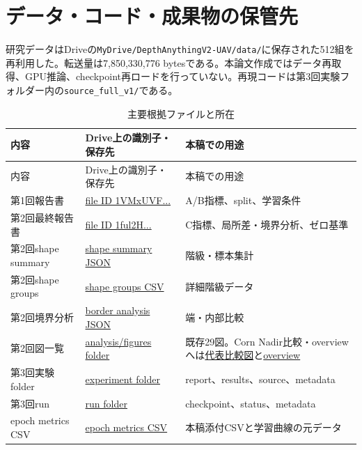 \section{データ・コード・成果物の保管先}
研究データはDriveの\texttt{MyDrive/DepthAnythingV2-UAV/data/}に保存された512組を再利用した。転送量は7,850,330,776 bytesである。本論文作成ではデータ再取得、GPU推論、checkpoint再ロードを行っていない。再現コードは第3回実験フォルダー内の\texttt{source\_full\_v1/}である。

\begin{longtable}{p{}p{}p{}}
\caption{主要根拠ファイルと所在}\label{tab:evidence}\\
\toprule 内容&Drive上の識別子・保存先&本稿での用途\\\midrule\endfirsthead
\toprule 内容&Drive上の識別子・保存先&本稿での用途\\\midrule\endhead
第1回報告書&\href{https://drive.google.com/file/d/1VMxUVF_IU3AqAfkJxukfUXoSpQLg9AyK/view}{file ID 1VMxUVF...}&A/B指標、split、学習条件\\
第2回最終報告書&\href{https://drive.google.com/file/d/1ful2HPTS2hxQaEfP2MKXYhXly_Au4QPE/view}{file ID 1ful2H...}&C指標、局所差・境界分析、ゼロ基準\\
第2回shape summary&\href{https://drive.google.com/file/d/1i1OxW1rB6Y0ac33AvAWvTyqJLDBMjV0H/view}{shape summary JSON}&階級・標本集計\\
第2回shape groups&\href{https://drive.google.com/file/d/1NbkSH6HvjyaIC1NBStsDSjVM0ox0MQWr/view}{shape groups CSV}&詳細階級データ\\
第2回境界分析&\href{https://drive.google.com/file/d/1U25edQrjgpiTXOlKlBDwYr_1pOwahQIK/view}{border analysis JSON}&端・内部比較\\
第2回図一覧&\href{https://drive.google.com/drive/folders/1RGQZpkQC0yzcuYoOJJ4ko0z6c4CWP2y3}{analysis/figures folder}&既存29図。Corn Nadir比較・overviewへは\href{https://drive.google.com/file/d/1ferTPKjV3D5lSlqZ4UORRwmfJH7NvbXH/view}{代表比較図}と\href{https://drive.google.com/file/d/1Gx3Y3r_Rd8YzXlUoace2Z3x_ZqDBDVla/view}{overview}\\
第3回実験folder&\href{https://drive.google.com/drive/folders/1sRjrWY4hGMa6ExJR_87fW85i-aMmD26T}{experiment folder}&report、results、source、metadata\\
第3回run&\href{https://drive.google.com/drive/folders/1lPYUTGEI1DFZAb7jwtg4K-vy6FYn_vU5}{run folder}&checkpoint、status、metadata\\
epoch metrics CSV&\href{https://drive.google.com/file/d/1ygYe-EXIaAFcvQBcQVbjoykwWEw-i2AI/view}{epoch metrics CSV}&本稿添付CSVと学習曲線の元データ\\

\end{longtable}
